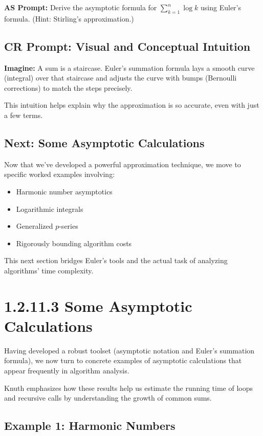 \documentclass{article}
\begin{document}
\textbf{AS Prompt:} Derive the asymptotic formula for $\sum_{k=1}^n \log k$ using Euler's formula. (Hint: Stirling’s approximation.)

\subsection*{CR Prompt: Visual and Conceptual Intuition}

\textbf{Imagine:} A sum is a staircase. Euler’s summation formula lays a smooth curve (integral) over that staircase and adjusts the curve with bumps (Bernoulli corrections) to match the steps precisely.

This intuition helps explain why the approximation is so accurate, even with just a few terms.

\subsection*{Next: Some Asymptotic Calculations}

Now that we’ve developed a powerful approximation technique, we move to specific worked examples involving:

\begin{itemize}
    \item Harmonic number asymptotics
    \item Logarithmic integrals
    \item Generalized $p$-series
    \item Rigorously bounding algorithm costs
\end{itemize}

This next section bridges Euler's tools and the actual task of analyzing algorithms' time complexity.

\newpage

\section*{1.2.11.3 Some Asymptotic Calculations}

Having developed a robust toolset (asymptotic notation and Euler’s summation formula), we now turn to concrete examples of asymptotic calculations that appear frequently in algorithm analysis.

Knuth emphasizes how these results help us estimate the running time of loops and recursive calls by understanding the growth of common sums.

\subsection*{Example 1: Harmonic Numbers}
\end{document}
